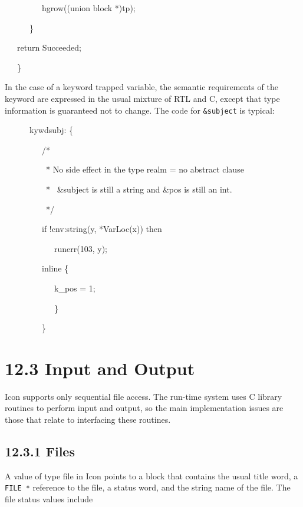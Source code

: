 {\ttfamily\mdseries
\ \ \ \ \ \ \ \ \ hgrow((union block *)tp);}

{\ttfamily\mdseries
\ \ \ \ \ \ \}}

{\ttfamily\mdseries
\ \ \ return Succeeded;}

{\ttfamily\mdseries
\ \ \ \}}


In the case of a keyword trapped variable, the semantic requirements
of the keyword are expressed in the usual mixture of RTL and C, except
that type information is guaranteed not to change. The code for
\texttt{\&subject} is typical:

{\ttfamily\mdseries
\ \ \ \ \ \ kywdsubj: \{}

{\ttfamily\mdseries
\ \ \ \ \ \ \ \ \ /*}

{\ttfamily\mdseries
\ \ \ \ \ \ \ \ \ \ * No side effect in the type realm = no abstract clause}

{\ttfamily\mdseries
\ \ \ \ \ \ \ \ \ \ * \ \&subject is still a string and \&pos is still an int.}

{\ttfamily\mdseries
\ \ \ \ \ \ \ \ \ \ */}

{\ttfamily\mdseries
\ \ \ \ \ \ \ \ \ if !cnv:string(y, *VarLoc(x)) then}

{\ttfamily\mdseries
\ \ \ \ \ \ \ \ \ \ \ \ runerr(103, y);}

{\ttfamily\mdseries
\ \ \ \ \ \ \ \ \ inline \{}

{\ttfamily\mdseries
\ \ \ \ \ \ \ \ \ \ \ \ k\_pos = 1;}

{\ttfamily\mdseries
\ \ \ \ \ \ \ \ \ \ \ \ \}}

{\ttfamily\mdseries
\ \ \ \ \ \ \ \ \ \}}


\section[12.3 Input and Output]{12.3 Input and Output}

Icon supports only sequential file access. The run-time system uses C
library routines to perform input and output, so the main
implementation issues are those that relate to interfacing these
routines.

\subsection[12.3.1 Files]{12.3.1 Files}

A value of type file in Icon points to a block that contains the usual
title word, a \texttt{FILE *} reference to the file, a status word,
and the string name of the file. The file status values include

